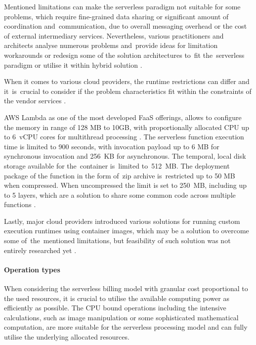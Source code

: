 Mentioned limitations can make the serverless paradigm not suitable for some problems, which require fine-grained data sharing or significant amount of coordination and~communication, due to overall messaging overhead or the cost of external intermediary services.
Nevertheless, various practitioners and architects analyse numerous problems and~provide ideas for limitation workarounds or redesign some of the solution architectures to~fit the~serverless paradigm or utilise it within hybrid solution \cite{BerkeleyServerless}.

When it comes to various cloud providers, the runtime restrictions can differ and it~is~crucial to consider if the problem characteristics fit within the constraints of the vendor services \cite{LeveragingServerlessCloudComputingArchitectures}.

AWS Lambda \cite{AWSLambdaQuotas} as one of the most developed FaaS offerings, allows to configure the memory in range of 128 MB to 10GB, with proportionally allocated CPU up to 6~vCPU cores for multithread processing \cite{AWSLambdaRAMandCPU}.
The serverless function execution time is limited to 900 seconds, with invocation payload up to 6 MB for synchronous invocation and 256~KB for asynchronous.
The temporal, local disk storage available for the~container is~limited to~512~MB.
The deployment package of the function in the form of~zip archive is~restricted up to 50 MB when compressed. When uncompressed the limit is set to 250~MB, including up to 5 layers, which are a solution to share some common code across multiple functions \cite{EvaluationOfServerlessApplicationProgrammingModel}.

Lastly, major cloud providers introduced various solutions for running custom execution runtimes using container images, which may be a solution to overcome some of~the~mentioned limitations, but feasibility of such solution was not entirely researched yet \cite{AWSLambdaContainerImageSupport}.

\paragraph{Operation types} \label{chapter:serverless-suitability-operation-types}

When considering the serverless billing model with granular cost proportional to the used resources, it is crucial to utilise the available computing power as efficiently as possible. The CPU bound operations including the intensive calculations, such as image manipulation or some sophisticated mathematical computation, are more suitable for the serverless processing model and can fully utilise the underlying allocated resources.

